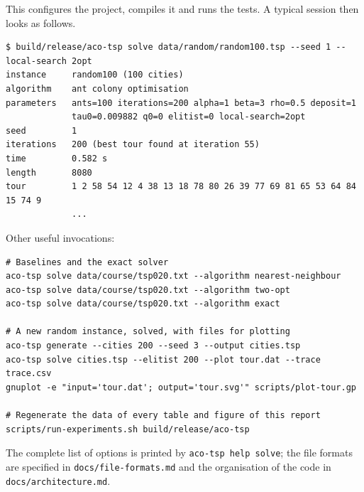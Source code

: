 \documentclass[11pt,a4paper]{article}
\newcommand{\code}[1]{\texttt{#1}}
\begin{document}
\noindent
This configures the project, compiles it and runs the tests. A typical session then looks
as follows.

\begin{lstlisting}
$ build/release/aco-tsp solve data/random/random100.tsp --seed 1 --local-search 2opt
instance     random100 (100 cities)
algorithm    ant colony optimisation
parameters   ants=100 iterations=200 alpha=1 beta=3 rho=0.5 deposit=1
             tau0=0.009882 q0=0 elitist=0 local-search=2opt
seed         1
iterations   200 (best tour found at iteration 55)
time         0.582 s
length       8080
tour         1 2 58 54 12 4 38 13 18 78 80 26 39 77 69 81 65 53 64 84 15 74 9
             ...
\end{lstlisting}

\noindent
Other useful invocations:

\begin{lstlisting}
# Baselines and the exact solver
aco-tsp solve data/course/tsp020.txt --algorithm nearest-neighbour
aco-tsp solve data/course/tsp020.txt --algorithm two-opt
aco-tsp solve data/course/tsp020.txt --algorithm exact

# A new random instance, solved, with files for plotting
aco-tsp generate --cities 200 --seed 3 --output cities.tsp
aco-tsp solve cities.tsp --elitist 200 --plot tour.dat --trace trace.csv
gnuplot -e "input='tour.dat'; output='tour.svg'" scripts/plot-tour.gp

# Regenerate the data of every table and figure of this report
scripts/run-experiments.sh build/release/aco-tsp
\end{lstlisting}

\noindent
The complete list of options is printed by \code{aco-tsp help solve}; the file formats are
specified in \code{docs/file-formats.md} and the organisation of the code in
\code{docs/architecture.md}.
\end{document}

